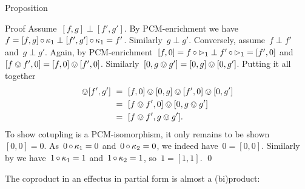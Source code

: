 \documentclass[b]{subfiles}
\begin{document}
\begin{parsec}
\begin{point}{Proposition}
\begin{point}{Proof}
Assume~$[f,g] \perp [f',g']$.
    By PCM-enrichment
    we have~$f = [f,g] \mathop{\circ} \kappa_1 \perp [f',g'] \mathop{\circ} \kappa_1 = f'$.
Similarly~$g \perp g'$.
Conversely, assume~$f \perp f'$ and~$g \perp g'$.
Again, by PCM-enrichment~$
[f,0] = f  \mathop{\circ} \mathord{\vartriangleright}_1 \perp f' \mathop{\circ} \mathord{\vartriangleright}_1 = [f', 0]$
    and~$[f\ovee f', 0 ] = [f,0] \ovee [f', 0]$.
Similarly~$[0,g \ovee g'] = [0,g] \ovee [0,g']$.
Putting it all together
\begin{align*}
[f, g] \ovee [f', g']
&\ = \ 
 [f, 0] \ovee [0,g] \ovee [f', 0] \ovee [0, g'] \\
 &\ = \ 
 [f\ovee f', 0]\ovee [0, g\ovee g'] \\
 &\ = \ 
 [f\ovee f', g \ovee g'].
\end{align*}
To show cotupling is a PCM-isomorphism,
    it only remains to be shown~$[0,0]=0$.
As~$0 \mathop{\circ} \kappa_1 = 0$
    and~$0 \mathop{\circ} \kappa_2 = 0$,
    we indeed have~$0 = [0,0]$.
Similarly by  we have~$1 \mathop{\circ} \kappa_1 = 1$
    and~$1 \mathop{\circ} \kappa_2 = 1$,
    so~$1 = [1,1]$. \qed
\end{point}
\end{point}

\begin{point}%
The coproduct in an effectus in partial form
is almost a (bi)product:
\end{point}


\end{parsec}
\end{document}
